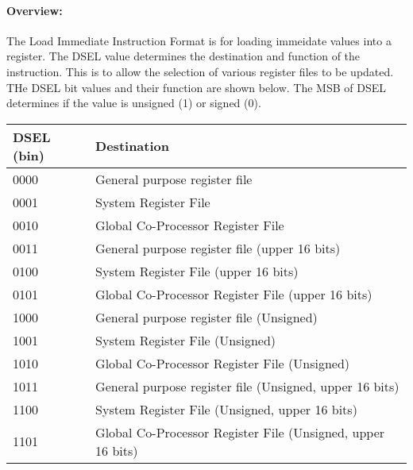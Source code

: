 \documentclass[letterpaper, 11pt]{article}
\begin{document}
\paragraph{Overview:}The Load Immediate Instruction Format is for loading immeidate values into a register.
The DSEL value determines the destination and function of the instruction. This is to allow the selection
of various register files to be updated. THe DSEL bit values and their function are shown below. 
The MSB of DSEL determines if the value is unsigned (1) or signed (0). \\
\begin{tabular}{l|l}
		DSEL (bin) & Destination \\ \hline
		0000 & General purpose register file \\
		0001 & System Register File \\
		0010 & Global Co-Processor Register File \\ 
		0011 & General purpose register file (upper 16 bits) \\
		0100 & System Register File (upper 16 bits)\\
		0101 & Global Co-Processor Register File (upper 16 bits)\\ 
		1000 & General purpose register file  (Unsigned)\\
		1001 & System Register File (Unsigned)\\
		1010 & Global Co-Processor Register File (Unsigned)\\ 
		1011 & General purpose register file  (Unsigned, upper 16 bits)\\
		1100 & System Register File (Unsigned, upper 16 bits)\\
		1101 & Global Co-Processor Register File (Unsigned, upper 16 bits)\\ 
		
		\end{tabular}
\end{document}
